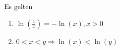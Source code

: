 Es gelten
\begin{enumerate}[label=\alph*)]
    \item $\ln(\frac{1}{x}) = -\ln(x), x>0$
    \item $0<x<y \Rightarrow \ln(x) < \ln(y)$
\end{enumerate}